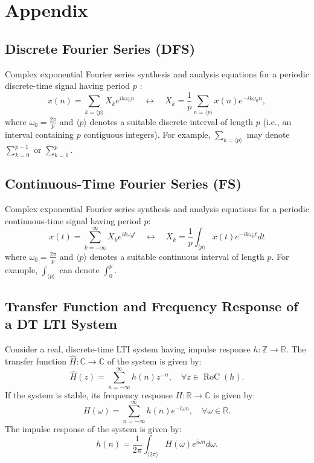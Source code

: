 \section{Appendix}
\subsection{Discrete Fourier Series (DFS)}
Complex exponential Fourier series synthesis and analysis equations for a periodic discrete-time signal having period $p$ :
\[
    x(n)=\sum_{k=\langle p\rangle} X_k e^{i k \omega_0 n} \quad \longleftrightarrow \quad X_k=\frac{1}{p} \sum_{n=\langle p\rangle} x(n) e^{-i k \omega_0 n},
\]
where $\omega_0=\frac{2 \pi}{p}$ and $\langle p\rangle$ denotes a suitable discrete interval of length $p$ (i.e., an interval containing $p$ contiguous integers). For example, $\sum_{k=\langle p\rangle}$ may denote $\displaystyle\sum_{k=0}^{p-1} \text { or } \sum_{k=1}^p .$

\subsection{Continuous-Time Fourier Series (FS)}
Complex exponential Fourier series synthesis and analysis equations for a periodic continuous-time signal having period $p$:
$$
x(t)=\sum_{k=-\infty}^{\infty} X_k e^{i k \omega_0 t} \quad \longleftrightarrow \quad X_k=\frac{1}{p} \int_{\langle p\rangle} x(t) e^{-i k \omega_0 t} d t
$$
where $\omega_0=\frac{2 \pi}{p}$ and $\langle p\rangle$ denotes a suitable continuous interval of length $p$. For example, $\displaystyle\int_{\langle p\rangle}$ can denote $\displaystyle\int_0^p$.

\subsection{Transfer Function and Frequency Response of a DT LTI System}
Consider a real, discrete-time LTI system having impulse response $h: \mathbb{Z} \rightarrow \mathbb{R}$. The transfer function $\widehat{H}: \mathbb{C} \rightarrow \mathbb{C}$ of the system is given by:
$$
\widehat{H}(z)=\sum_{n=-\infty}^{\infty} h(n) z^{-n}, \quad \forall z \in \operatorname{RoC}(h) .
$$
If the system is stable, its frequency response $H: \mathbb{R} \rightarrow \mathbb{C}$ is given by:
$$
H(\omega)=\sum_{n=-\infty}^{\infty} h(n) e^{-i \omega n}, \quad \forall \omega \in \mathbb{R} .
$$
The impulse response of the system is given by:
$$
h(n)=\frac{1}{2 \pi} \int_{\langle 2 \pi\rangle} H(\omega) e^{i \omega n} d \omega .
$$


